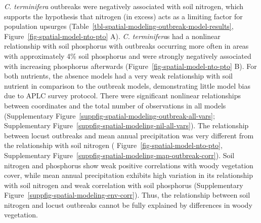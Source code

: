 \documentclass[
]{article}
\begin{document}
\emph{C. terminifera} outbreaks were negatively associated with soil
nitrogen, which supports the hypothesis that nitrogen (in excess) acts
as a limiting factor for population upsurges
(Table~\ref{tbl-spatial-modeling-outbreak-model-results},
Figure~\ref{fig-spatial-model-nto-pto} A). \emph{C. terminifera}s had a
nonlinear relationship with soil phosphorus with outbreaks occurring
more often in areas with approximately 4\% soil phosphorus and were
strongly negatively associated with increasing phosphorus afterwards
(Figure~\ref{fig-spatial-model-nto-pto} B). For both nutrients, the
absence models had a very weak relationship with soil nutrient in
comparison to the outbreak models, demonstrating little model bias due
to APLC survey protocol. There were significant nonlinear relationships
between coordinates and the total number of observations in all models
(Supplementary Figure~\ref{suppfig-spatial-modeling-outbreak-all-vars};
Supplementary Figure~\ref{suppfig-spatial-modeling-nil-all-vars}). The
relationship between locust outbreaks and mean annual precipitation was
very different from the relationship with soil nitrogen (
Figure~\ref{fig-spatial-model-nto-pto},
Supplementary Figure~\ref{suppfig-spatial-modeling-map-outbreak-corr}).
Soil nitrogen and phosphorus show weak positive correlations with woody
vegetation cover, while mean annual precipitation exhibits high
variation in its relationship with soil nitrogen and weak correlation
with soil phosphorus
(Supplementary Figure~\ref{suppfig-spatial-modeling-env-corr}). Thus,
the relationship between soil nitrogen and locust outbreaks cannot be
fully explained by differences in woody vegetation.
\end{document}
